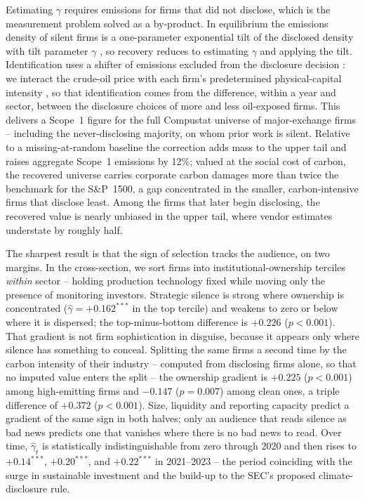 \documentclass[a4paper,12pt]{article}
\newcommand{\citet}[1]{\textcite{#1}}
\newcommand{\citep}[1]{\parencite{#1}}
\begin{document}
Estimating $\gamma$ requires emissions for firms that did not disclose, which is the measurement problem solved as a by-product. In equilibrium the emissions density of silent firms is a one-parameter exponential tilt of the disclosed density with tilt parameter $\gamma$ \citep{kim2011semiparametric}, so recovery reduces to estimating $\gamma$ and applying the tilt. Identification uses a shifter of emissions excluded from the disclosure decision \citep{wang2014instrumental}: we interact the crude-oil price with each firm's predetermined physical-capital intensity \citep{goldsmithpinkham2020bartik}, so that identification comes from the difference, within a year and sector, between the disclosure choices of more and less oil-exposed firms. This delivers a Scope~1 figure for the full Compustat universe of major-exchange firms -- including the never-disclosing majority, on whom prior work is silent. Relative to a missing-at-random baseline the correction adds mass to the upper tail and raises aggregate Scope~1 emissions by 12\%; valued at the social cost of carbon, the recovered universe carries corporate carbon damages more than twice the \citet{greenstone2023mandatory} benchmark for the S\&P~1500, a gap concentrated in the smaller, carbon-intensive firms that disclose least. Among the firms that later begin disclosing, the recovered value is nearly unbiased in the upper tail, where vendor estimates understate by roughly half.

The sharpest result is that the sign of selection tracks the audience, on two margins. In the cross-section, we sort firms into institutional-ownership terciles \emph{within} sector -- holding production technology fixed while moving only the presence of monitoring investors. Strategic silence is strong where ownership is concentrated ($\hat\gamma=+0.162^{***}$ in the top tercile) and weakens to zero or below where it is dispersed; the top-minus-bottom difference is $+0.226$ ($p<0.001$). That gradient is not firm sophistication in disguise, because it appears only where silence has something to conceal. Splitting the same firms a second time by the carbon intensity of their industry -- computed from disclosing firms alone, so that no imputed value enters the split -- the ownership gradient is $+0.225$ ($p<0.001$) among high-emitting firms and $-0.147$ ($p=0.007$) among clean ones, a triple difference of $+0.372$ ($p<0.001$). Size, liquidity and reporting capacity predict a gradient of the same sign in both halves; only an audience that reads silence as bad news predicts one that vanishes where there is no bad news to read. Over time, $\hat\gamma_t$ is statistically indistinguishable from zero through 2020 and then rises to $+0.14^{***}$, $+0.20^{***}$, and $+0.22^{***}$ in 2021--2023 -- the period coinciding with the surge in sustainable investment and the build-up to the SEC's proposed climate-disclosure rule. 
\end{document}
